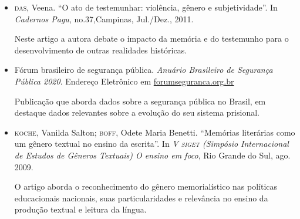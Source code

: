 \documentclass[11pt]{extarticle}
\begin{document}
\begin{itemize}



\item\textsc{das}, Veena. ``O ato de testemunhar: violência, gênero e subjetividade''. In
\emph{Cadernos Pagu}, no.37,Campinas, Jul./Dez., 2011. 

Neste artigo a autora debate o impacto da memória e do testemunho para o desenvolvimento 
de outras realidades históricas.

\item Fórum brasileiro de
segurança pública. \textit{Anuário Brasileiro de Segurança Pública 2020}. Endereço Eletrônico em
\href{https://forumseguranca.org.br/wp-content/uploads/2020/10/anuario-14-2020-v1-interativo.pdf}{forumseguranca.org.br} 

Publicação que aborda dados sobre a segurança pública no Brasil, em
destaque dados relevantes sobre a evolução do seu sistema prisional.




\item\textsc{koche}, Vanilda Salton; \textsc{boff}, Odete Maria Benetti. ``Memórias literárias
como um gênero textual no ensino da escrita''. In \emph{V \textsc{siget} (Simpósio
Internacional de Estudos de Gêneros Textuais) O ensino em foco}, Rio
Grande do Sul, ago. 2009. 

O artigo aborda o reconhecimento do gênero memorialístico nas políticas educacionais 
nacionais, suas particularidades e relevância no ensino da produção textual e leitura 
da língua.




\end{itemize}
\end{document}
